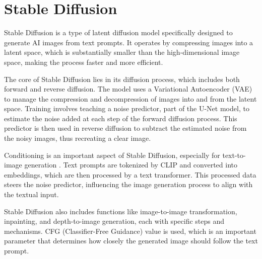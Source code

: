 \section{Stable Diffusion}\label{stableDiffusion}

Stable Diffusion \citep{rombachStableDiffusion} is a type of latent diffusion model specifically designed to generate AI images from text prompts. It operates by compressing images into a latent space, which is substantially smaller than the high-dimensional image space, making the process faster and more efficient.

The core of Stable Diffusion lies in its diffusion process, which includes both forward and reverse diffusion. The model uses a Variational Autoencoder (VAE) to manage the compression and decompression of images into and from the latent space. Training involves teaching a noise predictor, part of the U-Net model, to estimate the noise added at each step of the forward diffusion process. This predictor is then used in reverse diffusion to subtract the estimated noise from the noisy images, thus recreating a clear image.

Conditioning is an important aspect of Stable Diffusion, especially for text-to-image generation \citep{rombachStableDiffusion}. Text prompts are tokenized by CLIP and converted into embeddings, which are then processed by a text transformer. This processed data steers the noise predictor, influencing the image generation process to align with the textual input.

Stable Diffusion also includes functions like image-to-image transformation, inpainting, and depth-to-image generation, each with specific steps and mechanisms. CFG (Classifier-Free Guidance) value \citep{ho2022classifier} is used, which is an important parameter that determines how closely the generated image should follow the text prompt.